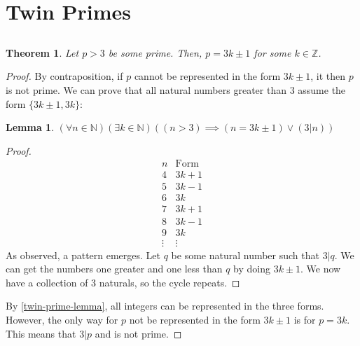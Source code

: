 \documentclass{article}
\newtheorem{theorem}{Theorem}
\newtheorem{lemma}{Lemma}
\newcommand{\N}{\mathbb{N}}
\newcommand{\Z}{\mathbb{Z}}
\begin{document}
\section{Twin Primes}

\subsection{}

\begin{theorem}
    Let \(p > 3\) be some prime.
    Then, \(p = 3k \pm 1\) for some \(k \in \Z\).
\end{theorem}
\begin{proof}
    By contraposition, if \(p\) cannot be represented in the form \(3k \pm 1\), it then \(p\) is not prime.
    We can prove that all natural numbers greater than \(3\) assume the form \(\{3k \pm 1, 3k\}\):
    \begin{lemma} \label{twin-prime-lemma}
        \((\forall n \in \N) (\exists k \in \N) ((n > 3) \implies (n = 3k \pm 1) \lor (3 | n))\)
    \end{lemma}
    \begin{proof}
        \begin{equation}
            \begin{array}{c|c}
                n & \text{Form} \\
                \hline
                4 & 3k + 1 \\
                5 & 3k - 1 \\
                6 & 3k \\
                7 & 3k + 1 \\
                8 & 3k - 1 \\
                9 & 3k \\
                \vdots & \vdots
            \end{array}
        \end{equation}
        As observed, a pattern emerges.
        Let \(q\) be some natural number such that \(3 | q\).
        We can get the numbers one greater and one less than \(q\) by doing \(3k \pm 1\).
        We now have a collection of 3 naturals, so the cycle repeats.
    \end{proof}
    By \autoref{twin-prime-lemma}, all integers can be represented in the three forms.
    However, the only way for \(p\) not be represented in the form \(3k \pm 1\) is for \(p = 3k\).
    This means that \(3 | p\) and is not prime.
\end{proof}
\end{document}
